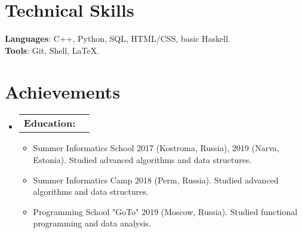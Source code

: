 \documentclass[letterpaper,11pt]{article}
\makeatletter
\newcommand{\resumeItem}[1]{
  \item\small{
    {#1 \vspace{-4pt}}
  }
}
\newcommand{\resumeProjectHeading}[2]{
    \item
    \begin{tabular*}{0.97\textwidth}{l@{\extracolsep{\fill}}r}
      \small#1 & #2 \\
    \end{tabular*}\vspace{-7pt}
}
\newcommand{\resumeSubHeadingListStart}{\begin{itemize}[leftmargin=0.15in, label={}]}
\newcommand{\resumeSubHeadingListEnd}{\end{itemize}}
\newcommand{\resumeItemListStart}{\begin{itemize}[leftmargin=0.15in]}
\newcommand{\resumeItemListEnd}{\end{itemize}\vspace{-5pt}}
\makeatother
\begin{document}
\section{Technical Skills}
\begin{itemize}[leftmargin=0.15in, label={}]
    \small{\item{
     \textbf{Languages}{: C++, Python, SQL, HTML/CSS, basic Haskell.} \\
     \textbf{Tools}{: Git, Shell, LaTeX.} \\
    }\vspace{-4pt}}
    
\end{itemize}




%
\section{Achievements}
    \resumeSubHeadingListStart
        \resumeProjectHeading
            {\textbf{Education: }}{}
            \resumeItemListStart
                \resumeItem{Summer Informatics School 2017 (Kostroma, Russia), 2019 (Narva, Estonia). Studied advanced algorithms and data structures.}
                \resumeItem{Summer Informatics Camp 2018 (Perm, Russia). Studied advanced algorithms and data structures.}
                \resumeItem{Programming School "GoTo" 2019 (Moscow, Russia). Studied functional programming and data analysis.}
            \resumeItemListEnd
    \resumeSubHeadingListEnd
\end{document}
